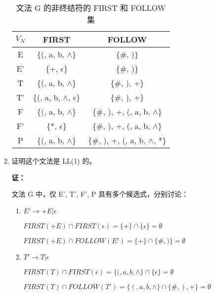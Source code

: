 \begin{enumerate}
\begin{enumerate}
        \begin{table}[H]
            \centering
            \begin{tabular}{|c|c|c|}
                \hline
                $V_N$ & FIRST & FOLLOW \\
                \hline
                E & \{(, a, b, $\wedge$\} & \{\#, )\} \\
                \hline
                E' & \{+, $\epsilon$\}  & \{\#, )\} \\
                \hline
                T & \{(, a, b, $\wedge$\} & \{\#, ), +\} \\
                \hline
                T' & \{(, a, b, $\wedge$, $\epsilon$\} & \{\#, ), +\} \\
                \hline
                F & \{(, a, b, $\wedge$\} & \{\#, ), +, (, a, b, $\wedge$\} \\
                \hline
                F' & \{*, $\epsilon$\}  & \{\#, ), +, (, a, b, $\wedge$\} \\
                \hline
                P & \{(, a, b, $\wedge$\} & \{\#, ), +, (, a, b, $\wedge$, *\} \\
                \hline
            \end{tabular}
            \caption{文法 G 的非终结符的 FIRST 和 FOLLOW 集}
            \label{tab:FF2}
        \end{table}
        
        \item 证明这个文法是 LL(1) 的。
        
        \textbf{证：}
        
        文法 G 中，仅 E', T', F', P 具有多个候选式，分别讨论：
        
        \begin{enumerate}
            \item $E' \to +E | \epsilon$
            
            $FIRST(+E) \cap FIRST(\epsilon) = \{+\} \cap \{\epsilon\} = \emptyset$
            
            $FIRST(+E) \cap FOLLOW(E') = \{+\} \cap \{\#, )\} = \emptyset$
            
            \item $T' \to T | \epsilon$
            
            $FIRST(T) \cap FIRST(\epsilon) = \{(, a, b, \wedge\} \cap \{\epsilon\} = \emptyset$
            
            $FIRST(T) \cap FOLLOW(T') = \{(, a, b, \wedge\} \cap \{\#, ), +\} = \emptyset$
            

\end{enumerate}
\end{enumerate}
\end{enumerate}
